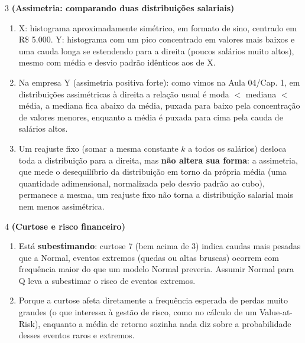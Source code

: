 \documentclass[11pt]{article}
\begin{document}
\begin{questao}{3} \textbf{(Assimetria: comparando duas distribuições salariais)}
\begin{solucao}
\begin{enumerate}[label=(\alph*)]
  \item X: histograma aproximadamente simétrico, em formato de sino, centrado em R\$ 5.000. Y:
    histograma com um pico concentrado em valores mais baixos e uma cauda longa se estendendo
    para a direita (poucos salários muito altos), mesmo com média e desvio padrão idênticos aos
    de X.
  \item Na empresa Y (assimetria positiva forte): como vimos na Aula 04/Cap. 1, em distribuições
    assimétricas à direita a relação usual é moda $<$ mediana $<$ média, a mediana fica abaixo da
    média, puxada para baixo pela concentração de valores menores, enquanto a média é puxada para
    cima pela cauda de salários altos.
  \item Um reajuste fixo (somar a mesma constante $k$ a todos os salários) desloca toda a
    distribuição para a direita, mas \textbf{não altera sua forma}: a assimetria, que mede o
    desequilíbrio da distribuição em torno da própria média (uma quantidade adimensional,
    normalizada pelo desvio padrão ao cubo), permanece a mesma, um reajuste fixo não torna a
    distribuição salarial mais nem menos assimétrica.
\end{enumerate}
\end{solucao}
\end{questao}

\begin{questao}{4} \textbf{(Curtose e risco financeiro)}
\begin{solucao}
\begin{enumerate}[label=(\alph*)]
  \item Está \textbf{subestimando}: curtose 7 (bem acima de 3) indica caudas mais pesadas que a Normal, eventos extremos (quedas ou altas bruscas) ocorrem com frequência maior do que um modelo
    Normal preveria. Assumir Normal para Q leva a subestimar o risco de eventos extremos.
  \item Porque a curtose afeta diretamente a frequência esperada de perdas muito grandes (o que
    interessa à gestão de risco, como no cálculo de um Value-at-Risk), enquanto a média de retorno
    sozinha nada diz sobre a probabilidade desses eventos raros e extremos.
\end{enumerate}
\end{solucao}
\end{questao}
\end{document}

